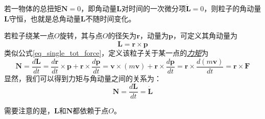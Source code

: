 \vspace{5pt}
\begin{theorem}[角动量守恒原理]
	若一物体的总扭矩$\bm{N}=0$，即角动量$\bm{L}$对时间的一次微分项$\dot{\bm{L}} = 0$，则粒子的角动量$\bm{L}$守恒，也就是总角动量$\bm{L}$不随时间变化。
\end{theorem}
若粒子绕某一点$O$旋转，其与点$O$的径矢为$\bm{r}$，动量为$\bm{p}$，可定义其角动量为
\begin{equation}
	\bm{L} = \bm{r} \times \bm{p}	\label{eq_angular_momentum}
\end{equation}
类似公式\eqref{eq_single_tot_force}，定义该粒子关于某一点的\underline{\textit{力矩}}为
\begin{equation}
	\bm{N} = \frac{d\bm{L}}{dt} = \frac{d \bm{r}}{dt} \times \bm{p} + \bm{r} \times \frac{d\bm{p}}{dt} = \bm{v} \times (m\bm{v}) + \bm{r} \times \frac{d\bm{p}}{dt} = \bm{r} \times \frac{d(m\bm{v})}{dt} = \bm{r} \times \bm{F}
\end{equation}
显然，我们可以得到力矩与角动量之间的关系为：
\begin{equation}
	\bm{N} = \frac{d\bm{L}}{dt} = \dot{\bm{L}}
\end{equation}
\begin{note}
	需要注意的是，$\bm{L}$和$\bm{N}$都依赖于点$O$。
\end{note}

